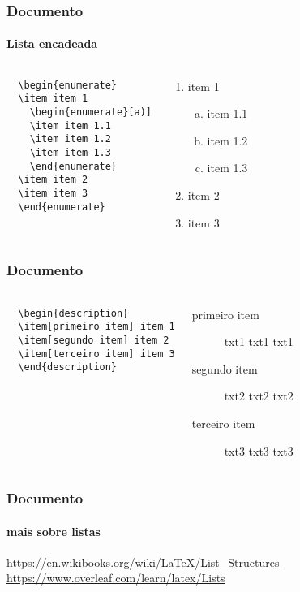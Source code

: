 \begin{frame}[fragile]
\frametitle{Documento}
\framesubtitle{Lista encadeada}
  \scriptsize
  \begin{columns}[c]
  \begin{verbatim}
  \begin{enumerate}
  \item item 1
    \begin{enumerate}[a)]
    \item item 1.1
    \item item 1.2
    \item item 1.3
    \end{enumerate}
  \item item 2
  \item item 3
  \end{enumerate}
  \end{verbatim}
  \begin{fmpage}{\textwidth}
  \begin{enumerate}
  \item item 1
    \begin{enumerate}[a)]
    \item item 1.1
    \item item 1.2
    \item item 1.3
    \end{enumerate}
  \item item 2
  \item item 3
  \end{enumerate}
  \end{fmpage}
  \end{columns}
\end{frame}


\begin{frame}[fragile]
\frametitle{Documento}
\framesubtitle{}
  \scriptsize
  \begin{columns}[c]
  \begin{verbatim}
  \begin{description}
  \item[primeiro item] item 1
  \item[segundo item] item 2
  \item[terceiro item] item 3
  \end{description}
  \end{verbatim}
  \begin{fmpage}{\textwidth}
  \begin{description}
  \item[primeiro item] txt1 txt1 txt1
  \item[segundo item] txt2 txt2 txt2
  \item[terceiro item] txt3 txt3 txt3
  \end{description}
  \end{fmpage}
  \end{columns}
\end{frame}


\begin{frame}[fragile]
\frametitle{Documento}
\framesubtitle{mais sobre listas}
\url{https://en.wikibooks.org/wiki/LaTeX/List_Structures}
\url{https://www.overleaf.com/learn/latex/Lists}
\end{frame}